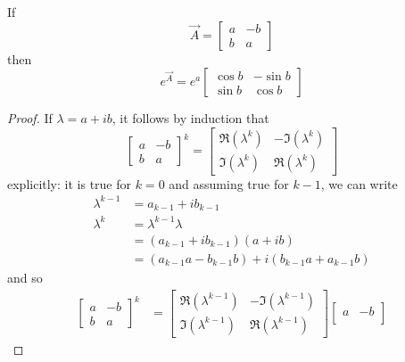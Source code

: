 \begin{proposition} %
	\label{prop:la:complex}
	If
	\begin{equation*}
		\vec A =
			\begin{bmatrix}
				a 	& -b \\
				b 	& a
			\end{bmatrix}
	\end{equation*}
	then
	\begin{equation*}
		e^{\vec A} = e^a
			\begin{bmatrix}
				\cos b 	& -\sin b \\
				\sin b 	& \cos b
			\end{bmatrix}
	\end{equation*}
\end{proposition}

\begin{proof}
	If $\lambda = a + ib$, it follows by induction that
	\begin{equation*}
		\begin{bmatrix}
			a & -b \\
			b & a
		\end{bmatrix}^k
		= 
		\begin{bmatrix}
			\Re(\lambda^k) & -\Im(\lambda^k) \\
			\Im(\lambda^k) & \Re(\lambda^k)
		\end{bmatrix}
	\end{equation*}
	explicitly: it is true for $k = 0$ and assuming true for $k - 1$, we can write
	\begin{align*}
		\lambda^{k - 1} &= a_{k - 1} + ib_{k - 1} \\
		\lambda^k 	&= \lambda^{k - 1} \lambda \\
					&= (a_{k - 1} + ib_{k - 1})(a + ib) \\
					&= (a_{k - 1}a - b_{k - 1}b) + i(b_{k - 1}a + a_{k - 1}b)
	\end{align*}
	and so
	\begin{align*}
		\begin{bmatrix}
			a & -b \\
			b & a
		\end{bmatrix}^k
		&=
		\begin{bmatrix}
			\Re(\lambda^{k - 1}) & -\Im(\lambda^{k - 1}) \\
			\Im(\lambda^{k - 1}) & \Re(\lambda^{k - 1})
		\end{bmatrix}
		\begin{bmatrix}
			a & -b \\

\end{bmatrix}
\end{align*}
\end{proof}

